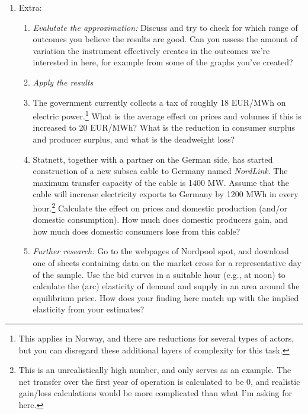 \documentclass[12pt,a4paper]{article}
\begin{document}
\begin{enumerate}
\item Extra:
\begin{enumerate}
\item \emph{Evalutate the approximation:} Discuss and try to check for which range of outcomes you believe the results are good. Can you assess the amount of variation the instrument effectively creates in the outcomes we're interested in here, for example from some of the graphs you've created?
\item[] \emph{Apply the results}
\item The government currently collects a tax of roughly 18 EUR/MWh on electric power.\footnote{This applies in Norway, and there are reductions for several types of actors, but you can disregard these additional layers of complexity for this task.} What is the average effect on prices and volumes if this is increased to 20 EUR/MWh? What is the reduction in consumer surplus and producer surplus, and what is the deadweight loss?
\item Statnett, together with a partner on the German side, has started construction of a new subsea cable to Germany named \emph{NordLink}. The maximum transfer capacity of the cable is 1400 MW. Assume that the cable will increase electricity exports to Germany by 1200 MWh in every hour.\footnote{This is an unrealistically high number, and only serves as an example. The net transfer over the first year of operation is calculated to be 0, and realistic gain/loss calculations would be more complicated than what I'm asking for here.} Calculate the effect on prices and domestic production (and/or domestic consumption). How much does domestic producers gain, and how much does domestic consumers lose from this cable?
\item \emph{Further research:} Go to the webpages of Nordpool spot, and download one of sheets containing data on the market cross for a representative day of the sample. Use the bid curves in a suitable hour (e.g., at noon) to calculate the (arc) elasticity of demand and supply in an area around the equilibrium price. How does your finding here match up with the implied elasticity from your estimates?
\end{enumerate}
\end{enumerate}
\end{document}
